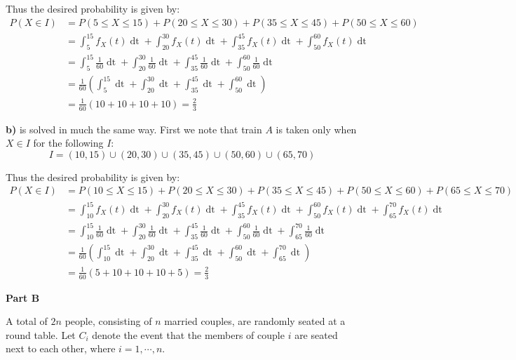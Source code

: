 \documentclass{article}
\begin{document}
Thus the desired probability is given by:
\begin{align*}
    P(X\in I)&=P(5\le X\le 15)+P(20\le X\le 30)+P(35\le X\le 45)+P(50\le X\le 60)\\
    &=\int_{5}^{15} f_X(t)\mathop{dt}+\int_{20}^{30} f_X(t)\mathop{dt}+\int_{35}^{45} f_X(t)\mathop{dt}+\int_{50}^{60} f_X(t)\mathop{dt}\\
    &=\int_{5}^{15} \frac{1}{60}\mathop{dt}+\int_{20}^{30} \frac{1}{60}\mathop{dt}+\int_{35}^{45} \frac{1}{60}\mathop{dt}+\int_{50}^{60} \frac{1}{60}\mathop{dt}\tag{uniform distribution}\\
    &=\frac{1}{60}\left(\int_{5}^{15}\mathop{dt}+\int_{20}^{30}\mathop{dt}+\int_{35}^{45}\mathop{dt}+\int_{50}^{60}\mathop{dt}\right)\\
    &=\frac{1}{60}\left(10+10+10+10\right)=\frac{2}{3}
\end{align*}

\textbf{b)} is solved in much the same way. First we note that train $A$ is taken only when $X\in I$ for the following $I$:
\begin{equation*}
    I=(10,15)\cup(20,30)\cup(35,45)\cup(50,60)\cup(65,70)
\end{equation*}

Thus the desired probability is given by:
\begin{align*}
    P(X\in I)&=P(10\le X\le 15)+P(20\le X\le 30)+P(35\le X\le 45)+P(50\le X\le 60)+P(65\le X\le 70)\\
    &=\int_{10}^{15} f_X(t)\mathop{dt}+\int_{20}^{30} f_X(t)\mathop{dt}+\int_{35}^{45} f_X(t)\mathop{dt}+\int_{50}^{60} f_X(t)\mathop{dt}+\int_{65}^{70} f_X(t)\mathop{dt}\\
    &=\int_{10}^{15} \frac{1}{60}\mathop{dt}+\int_{20}^{30} \frac{1}{60}\mathop{dt}+\int_{35}^{45} \frac{1}{60}\mathop{dt}+\int_{50}^{60} \frac{1}{60}\mathop{dt}+\int_{65}^{70} \frac{1}{60}\mathop{dt}\tag{uniform distribution}\\
    &=\frac{1}{60}\left(\int_{10}^{15}\mathop{dt}+\int_{20}^{30}\mathop{dt}+\int_{35}^{45}\mathop{dt}+\int_{50}^{60}\mathop{dt}+\int_{65}^{70}\mathop{dt}\right)\\
    &=\frac{1}{60}\left(5+10+10+10+5\right)=\frac{2}{3}
\end{align*}
\bigskip

\begin{center}
    \Large{\textbf{Part B}}
\end{center}

A total of $2n$ people, consisting of $n$ married couples, are randomly seated at a round table. Let $C_i$ denote the event that the members of couple $i$ are seated next to each other, where $i=1,\cdots,n$.
\bigskip
\end{document}
